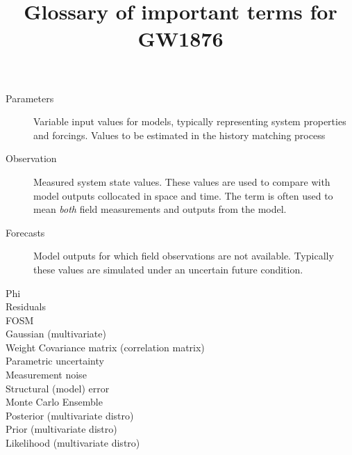 \documentclass[english]{article}
\begin{document}
\title{Glossary of important terms for GW1876}
\maketitle

\begin{description}
\item [Parameters] Variable input values for models, typically representing system properties and forcings. Values to be estimated in the history matching process
\item [Observation] Measured system state values. These values are used to compare with model outputs collocated in space and time. The term is often used to mean \emph{both} field measurements and outputs from the model. 
\item [Forecasts] Model outputs for which field observations are not available. Typically these values are simulated under an uncertain future condition.
\item [Phi]
\item [Residuals]
\item [FOSM]
\item [Gaussian (multivariate)]
\item [Weight Covariance matrix (correlation matrix)]
\item [Parametric uncertainty]
\item [Measurement noise]
\item [Structural (model) error]
\item [Monte Carlo Ensemble]
\item [Posterior (multivariate distro)]
\item [Prior (multivariate distro)]
\item [Likelihood (multivariate distro)] 

\end{description}
\end{document}
